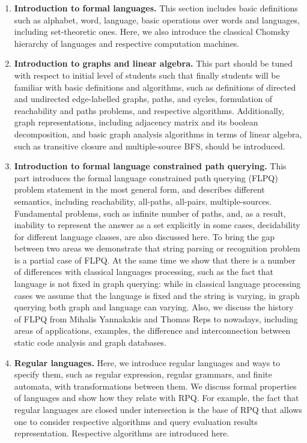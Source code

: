\documentclass[sigconf]{acmart}
\begin{document}
\begin{enumerate}
  \item \label{fl_intro} \textbf{Introduction to formal languages.} This section includes basic definitions such as alphabet, word, language, basic operations over words and languages, including set-theoretic ones. 
  Here, we also introduce the classical Chomsky hierarchy of languages and respective computation machines.
  
  \item \label{graphs_intro} \textbf{Introduction to graphs and linear algebra.} This part should be tuned with respect to initial level of students such that finally students will be familiar with basic definitions and algorithms, such as definitions of directed and undirected edge-labelled graphs, paths, and cycles, formulation of reachability and paths problems, and respective algorithms. 
  Additionally, graph representations, including adjacency matrix and its boolean decomposition, and basic graph analysis algorithms in terms of linear algebra, such as transitive closure and multiple-source BFS, should be introduced.
  
  \item \label{flpq_intro} \textbf{Introduction to formal language constrained path querying.} 
  This part introduces the formal language constrained path querying (FLPQ)~\cite{10.1137/S0097539798337716} problem statement in the most general form, and describes different semantics, including reachability, all-paths, all-pairs, multiple-sources. 
  Fundamental problems, such as infinite number of paths, and, as a result, inability to represent the answer as a set explicitly in some cases, decidability for different language classes, are also discussed here.
  To bring the gap between two areas we demonstrate that string parsing or recognition problem is a partial case of FLPQ. 
  At the same time we show that there is a number of differences with classical languages processing, such as the fact that language is not fixed in graph querying: while in classical language processing cases we assume that the language is fixed and the string is varying, in graph querying both graph and language can varying.
  Also, we discuss the history of FLPQ from Mihalis Yannakakis and Thomas Reps to nowadays, including areas of applications, examples, the difference and interconnection between static code analysis and graph databases.

  \item \label{regular_languages_intro} \textbf{Regular languages.} Here, we introduce regular languages and ways to specify them, such as regular expression, regular grammars, and finite automata, with transformations between them. 
  We discuss formal properties of languages and show how they relate with RPQ.
  For example, the fact that regular languages are closed under intersection is the base of RPQ that allows one to consider respective algorithms and query evaluation results representation.
  Respective algorithms are introduced here.
  

\end{enumerate}
\end{document}
